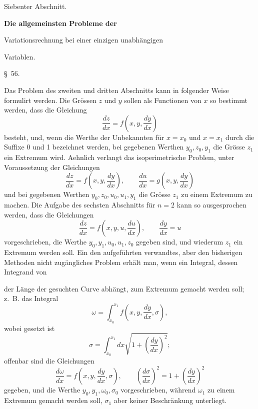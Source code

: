 \documentclass[11pt,a4paper,leqno]{article}
\begin{document}


\begin{center}
{\Large Siebenter Abschnitt.}

\vspace{1em}
{\Large\bfseries Die allgemeinsten Probleme der\par
Variationsrechnung bei einer einzigen unabhängigen\par
Variablen.}

\vspace{1em}
{\large \S~56.}
\end{center}

Das Problem des zweiten und dritten Abschnitts kann in
folgender Weise formulirt werden. Die Grössen $z$ und $y$ sollen
als Functionen von $x$ so bestimmt werden, dass die Gleichung
\[
\frac{dz}{dx}=f\left(x,y,\frac{dy}{dx}\right)
\]
besteht, und, wenn die Werthe der Unbekannten für $x=x_0$ und
$x=x_1$ durch die Suffixe 0 und 1 bezeichnet werden, bei gegebenen
Werthen $y_0,z_0,y_1$ die Grösse $z_1$ ein Extremum wird.
Aehnlich verlangt das isoperimetrische Problem, unter Voraussetzung
der Gleichungen
\[
\frac{dz}{dx}=f\left(x,y,\frac{dy}{dx}\right),\qquad
\frac{du}{dx}=g\left(x,y,\frac{dy}{dx}\right)
\]
und bei gegebenen Werthen $y_0,z_0,u_0,u_1,y_1$ die Grösse $z_1$ zu
einem Extremum zu machen. Die Aufgabe des sechsten Abschnitts für
$n=2$ kann so ausgesprochen werden, dass die Gleichungen
\[
\frac{dz}{dx}=f\left(x,y,u,\frac{du}{dx}\right),\qquad
\frac{dy}{dx}=u
\]
vorgeschrieben, die Werthe $y_0,y_1,u_0,u_1,z_0$ gegeben sind, und
wiederum $z_1$ ein Extremum werden soll. Ein den aufgeführten
verwandtes, aber den bisherigen Methoden nicht zugängliches Problem
erhält man, wenn ein Integral, dessen Integrand von

der Länge der gesuchten Curve abhängt, zum Extremum gemacht werden
soll; z.~B. das Integral
\[
\omega=\int_{x_0}^{x_1}f\left(x,y,\frac{dy}{dx},\sigma\right),
\]
wobei gesetzt ist
\[
\sigma=\int_{x_0}^{x_1}dx\sqrt{1+\left(\frac{dy}{dx}\right)^2};
\]
offenbar sind die Gleichungen
\[
\frac{d\omega}{dx}=f\left(x,y,\frac{dy}{dx},\sigma\right),\qquad
\left(\frac{d\sigma}{dx}\right)^2=1+\left(\frac{dy}{dx}\right)^2
\]
gegeben, und die Werthe $y_0,y_1,\omega_0,\sigma_0$ vorgeschrieben,
während $\omega_1$ zu einem Extremum gemacht werden soll, $\sigma_1$
aber keiner Beschränkung unterliegt.
\end{document}
